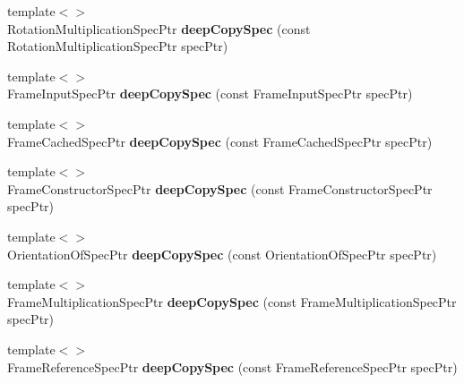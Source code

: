 \begin{DoxyCompactItemize}
\item 
\hypertarget{namespacegiskard__suturo_ae307bfc308c079e1ed92a6850f44255e}{{\footnotesize template$<$$>$ }\\Rotation\-Multiplication\-Spec\-Ptr {\bfseries deep\-Copy\-Spec} (const Rotation\-Multiplication\-Spec\-Ptr spec\-Ptr)}\label{namespacegiskard__suturo_ae307bfc308c079e1ed92a6850f44255e}

\item 
\hypertarget{namespacegiskard__suturo_aa63c9dbd4d7b02dfbc03dd923ffbcd71}{{\footnotesize template$<$$>$ }\\Frame\-Input\-Spec\-Ptr {\bfseries deep\-Copy\-Spec} (const Frame\-Input\-Spec\-Ptr spec\-Ptr)}\label{namespacegiskard__suturo_aa63c9dbd4d7b02dfbc03dd923ffbcd71}

\item 
\hypertarget{namespacegiskard__suturo_adb1d1adedd8f6b837787dad39a2832c1}{{\footnotesize template$<$$>$ }\\Frame\-Cached\-Spec\-Ptr {\bfseries deep\-Copy\-Spec} (const Frame\-Cached\-Spec\-Ptr spec\-Ptr)}\label{namespacegiskard__suturo_adb1d1adedd8f6b837787dad39a2832c1}

\item 
\hypertarget{namespacegiskard__suturo_a07892b4d91f71d663e4133efd6057571}{{\footnotesize template$<$$>$ }\\Frame\-Constructor\-Spec\-Ptr {\bfseries deep\-Copy\-Spec} (const Frame\-Constructor\-Spec\-Ptr spec\-Ptr)}\label{namespacegiskard__suturo_a07892b4d91f71d663e4133efd6057571}

\item 
\hypertarget{namespacegiskard__suturo_a99dd770e2f082d16a7fc4cb305931919}{{\footnotesize template$<$$>$ }\\Orientation\-Of\-Spec\-Ptr {\bfseries deep\-Copy\-Spec} (const Orientation\-Of\-Spec\-Ptr spec\-Ptr)}\label{namespacegiskard__suturo_a99dd770e2f082d16a7fc4cb305931919}

\item 
\hypertarget{namespacegiskard__suturo_a0d2941fb5a3b3f4f4c9aaa291e67117a}{{\footnotesize template$<$$>$ }\\Frame\-Multiplication\-Spec\-Ptr {\bfseries deep\-Copy\-Spec} (const Frame\-Multiplication\-Spec\-Ptr spec\-Ptr)}\label{namespacegiskard__suturo_a0d2941fb5a3b3f4f4c9aaa291e67117a}

\item 
\hypertarget{namespacegiskard__suturo_a6bc74bd7d5565a28fa41e3d46acf0132}{{\footnotesize template$<$$>$ }\\Frame\-Reference\-Spec\-Ptr {\bfseries deep\-Copy\-Spec} (const Frame\-Reference\-Spec\-Ptr spec\-Ptr)}\label{namespacegiskard__suturo_a6bc74bd7d5565a28fa41e3d46acf0132}


\end{DoxyCompactItemize}
